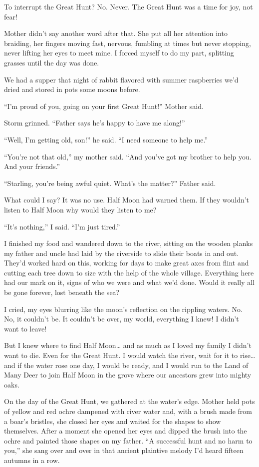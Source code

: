 To interrupt the Great Hunt? No. Never. The Great Hunt was a time for joy, not fear!

Mother didn't say another word after that. She put all her attention into braiding, her fingers moving fast, nervous, fumbling at times but never stopping, never lifting her eyes to meet mine. I forced myself to do my part, splitting grasses until the day was done.

We had a supper that night of rabbit flavored with summer raspberries we'd dried and stored in pots some moons before.

``I'm proud of you, going on your first Great Hunt!'' Mother said.

Storm grinned. ``Father says he's happy to have me along!''

``Well, I'm getting old, son!'' he said. ``I need someone to help me.''

``You're not that old,'' my mother said. ``And you've got my brother to help you. And your friends.''

``Starling, you're being awful quiet. What's the matter?'' Father said.

What could I say? It was no use. Half Moon had warned them. If they wouldn't listen to Half Moon why would they listen to me?

``It's nothing,'' I said. ``I'm just tired.''

I finished my food and wandered down to the river, sitting on the wooden planks my father and uncle had laid by the riverside to slide their boats in and out. They'd worked hard on this, working for days to make great axes from flint and cutting each tree down to size with the help of the whole village. Everything here had our mark on it, signs of who we were and what we'd done. Would it really all be gone forever, lost beneath the sea?

I cried, my eyes blurring like the moon's reflection on the rippling waters. No. No, it couldn't be. It couldn't be over, my world, everything I knew! I didn't want to leave!

But I knew where to find Half Moon\ldots{} and as much as I loved my family I didn't want to die. Even for the Great Hunt. I would watch the river, wait for it to rise\ldots{} and if the water rose one day, I would be ready, and I would run to the Land of Many Deer to join Half Moon in the grove where our ancestors grew into mighty oaks.

\secdiv

On the day of the Great Hunt, we gathered at the water's edge. Mother held pots of yellow and red ochre dampened with river water and, with a brush made from a boar's bristles, she closed her eyes and waited for the shapes to show themselves. After a moment she opened her eyes and dipped the brush into the ochre and painted those shapes on my father. ``A successful hunt and no harm to you,'' she sang over and over in that ancient plaintive melody I'd heard fifteen autumns in a row.

